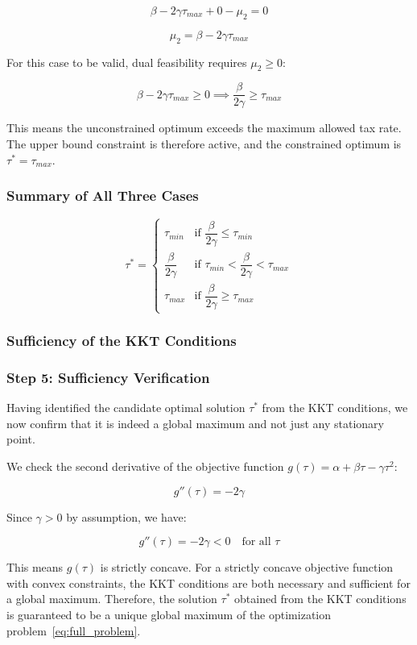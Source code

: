 \documentclass[12pt,a4paper]{report}
\theoremstyle{definition}
\theoremstyle{plain}
\theoremstyle{remark}
\newcommand{\taustar}{\tau^{*}}
\begin{document}
	\begin{equation}
		\beta - 2\gamma\tau_{max} + 0 - \mu_2 = 0
	\end{equation}
	
	\begin{equation}
		\mu_2 = \beta - 2\gamma\tau_{max}
		\label{eq:case3_mu2}
	\end{equation}
	
	For this case to be valid, dual feasibility requires 
	$\mu_2 \geq 0$:
	
	\[
	\beta - 2\gamma\tau_{max} \geq 0 \implies 
	\frac{\beta}{2\gamma} \geq \tau_{max}
	\]
	
	This means the unconstrained optimum exceeds the maximum 
	allowed tax rate. The upper bound constraint is therefore 
	active, and the constrained optimum is 
	$\taustar = \tau_{max}$.
	
	\subsubsection*{Summary of All Three Cases}
	
	\begin{equation}
		\taustar =
		\begin{cases}
			\tau_{min} & \text{if } \dfrac{\beta}{2\gamma} 
			\leq \tau_{min} \\[10pt]
			\dfrac{\beta}{2\gamma} & \text{if } \tau_{min} < 
			\dfrac{\beta}{2\gamma} < \tau_{max} \\[10pt]
			\tau_{max} & \text{if } \dfrac{\beta}{2\gamma} 
			\geq \tau_{max}
		\end{cases}
		\label{eq:cases_summary}
	\end{equation}
	\subsubsection{Sufficiency of the KKT Conditions}
	
	\subsubsection{Step 5: Sufficiency Verification}
	Having identified the candidate optimal solution $\taustar$ 
	from the KKT conditions, we now confirm that it is indeed 
	a global maximum and not just any stationary point.
	
	We check the second derivative of the objective function 
	$g(\tau) = \alpha + \beta\tau - \gamma\tau^2$:
	
	\[
	g''(\tau) = -2\gamma
	\]
	
	Since $\gamma > 0$ by assumption, we have:
	
	\[
	g''(\tau) = -2\gamma < 0 \quad \text{for all } \tau
	\]
	
	This means $g(\tau)$ is strictly concave. 
	For a strictly concave objective function with convex constraints, the KKT conditions are both necessary and sufficient for a global maximum. Therefore, the solution 
	$\taustar$ obtained from the KKT conditions is guaranteed to 
	be a unique global maximum of the optimization 
	problem~\eqref{eq:full_problem}.
	
\end{document}

